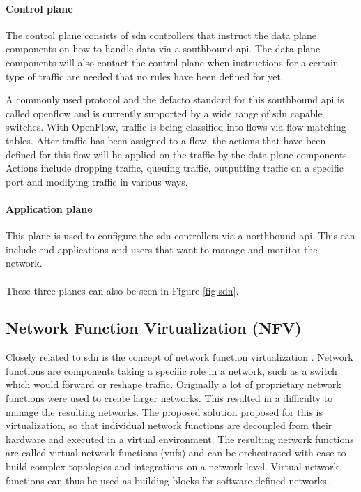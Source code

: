 \paragraph{Control plane} The control plane consists of \acrshort{sdn} controllers that instruct the data plane components on how to handle data via a southbound \acrshort{api}. The data plane components will also contact the control plane when instructions for a certain type of traffic are needed that no rules have been defined for yet.

A commonly used protocol and the defacto standard for this southbound \acrshort{api} is called \Gls{openflow} \cite{openflow} and is currently supported by a wide range of \acrshort{sdn} capable switches. With OpenFlow, traffic is being classified into flows via flow matching tables. After traffic has been assigned to a flow, the actions that have been defined for this flow will be applied on the traffic by the data plane components. Actions include dropping traffic, queuing traffic, outputting traffic on a specific port and modifying traffic in various ways.

\paragraph{Application plane} This plane is used to configure the \acrshort{sdn} controllers via a northbound \acrshort{api}. This can include end applications and users that want to manage and monitor the network.

\paragraph{}These three planes can also be seen in Figure \ref{fig:sdn}.

\subsection{Network Function Virtualization (NFV)}
Closely related to \acrshort{sdn} is the concept of network function virtualization \cite{nfv}. Network functions are components taking a specific role in a network, such as a switch which would forward or reshape traffic. Originally a lot of proprietary network functions were used to create larger networks. This resulted in a difficulty to manage the resulting networks. The proposed solution proposed for this is virtualization, so that individual network functions are decoupled from their hardware and executed in a virtual environment. The resulting network functions are called virtual network functions (\acrshort{vnf}s) and can be orchestrated with ease to build complex topologies and integrations on a network level. Virtual network functions can thus be used as building blocks for software defined networks.

